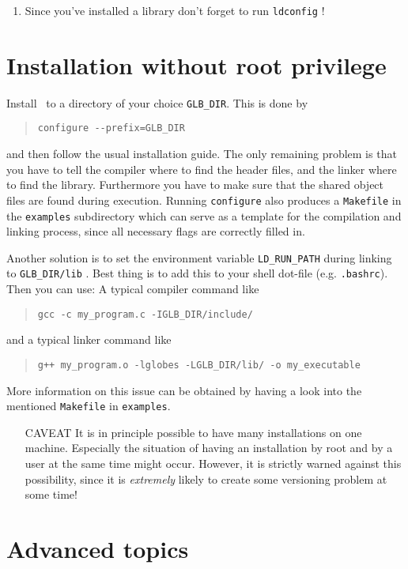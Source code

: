 \begin{appendix}
\begin{enumerate}
\item Since you've installed a library don't forget to run \verb+ldconfig+ !
\end{enumerate}
\section*{Installation without root privilege}
\label{inst_noroot}

Install \GLOBES\ to a directory of your choice \verb+GLB_DIR+. This is done by
\begin{quote}
\verb+configure --prefix=GLB_DIR+
\end{quote}
and then follow the usual installation guide. The only remaining problem
is that you have to tell the compiler where to find the header files, and 
the linker where to find the library. Furthermore you have to make sure 
that the shared object files are found during execution. Running 
\verb+configure+
also produces a \verb+Makefile+ in the \verb+examples+ 
subdirectory which can serve as
a template for the compilation and linking process, since all necessary
flags are correctly filled in. 

Another solution is to set the environment variable \verb+LD_RUN_PATH+
during linking to \verb+GLB_DIR/lib+ . Best thing is to add this to your
shell dot-file (e.g. \verb+.bashrc+). Then you can use:
A typical compiler command like
\begin{quote}
\verb+gcc -c my_program.c -IGLB_DIR/include/+
\end{quote}
and a typical linker command like
\begin{quote}
\verb#g++ my_program.o -lglobes -LGLB_DIR/lib/ -o my_executable#
\end{quote}
More information on this issue can be obtained by having a look 
into the mentioned  \verb+Makefile+ in \verb+examples+. 

\begin{itemize}
\item[CAVEAT] It is in principle possible to have many installations 
on one machine. Especially the situation of having an installation by root and by a user at the same time might occur. However, it is strictly warned against this possibility, since it is \emph{extremely} likely to create some versioning problem at some time!
\end{itemize}

\section*{Advanced topics}


\end{appendix}
